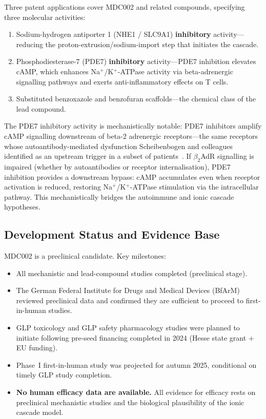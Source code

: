 Three patent applications cover MDC002 and related compounds, specifying three molecular activities:

\begin{enumerate}
    \item Sodium-hydrogen antiporter 1 (NHE1 / SLC9A1) \textbf{inhibitory} activity---reducing the proton-extrusion/sodium-import step that initiates the cascade.
    \item Phosphodiesterase-7 (PDE7) \textbf{inhibitory} activity---PDE7 inhibition elevates cAMP, which enhances Na$^+$/K$^+$-ATPase activity via beta-adrenergic signalling pathways and exerts anti-inflammatory effects on T cells.
    \item Substituted benzoxazole and benzofuran scaffolds---the chemical class of the lead compound.
\end{enumerate}

The PDE7 inhibitory activity is mechanistically notable: PDE7 inhibitors amplify cAMP signalling downstream of beta-2 adrenergic receptors---the same receptors whose autoantibody-mediated dysfunction Scheibenbogen and colleagues identified as an upstream trigger in a subset of patients~\cite{Loebel2016,WirthScheibenbogen2020}. If $\beta_2$AdR signalling is impaired (whether by autoantibodies or receptor internalisation), PDE7 inhibition provides a downstream bypass: cAMP accumulates even when receptor activation is reduced, restoring Na$^+$/K$^+$-ATPase stimulation via the intracellular pathway. This mechanistically bridges the autoimmune and ionic cascade hypotheses.

\subsection{Development Status and Evidence Base}

MDC002 is a preclinical candidate. Key milestones:

\begin{itemize}
    \item All mechanistic and lead-compound studies completed (preclinical stage).
    \item The German Federal Institute for Drugs and Medical Devices (BfArM) reviewed preclinical data and confirmed they are sufficient to proceed to first-in-human studies.
    \item GLP toxicology and GLP safety pharmacology studies were planned to initiate following pre-seed financing completed in 2024 (Hesse state grant + EU funding).
    \item Phase~I first-in-human study was projected for autumn 2025, conditional on timely GLP study completion.
    \item \textbf{No human efficacy data are available.} All evidence for efficacy rests on preclinical mechanistic studies and the biological plausibility of the ionic cascade model.
\end{itemize}

